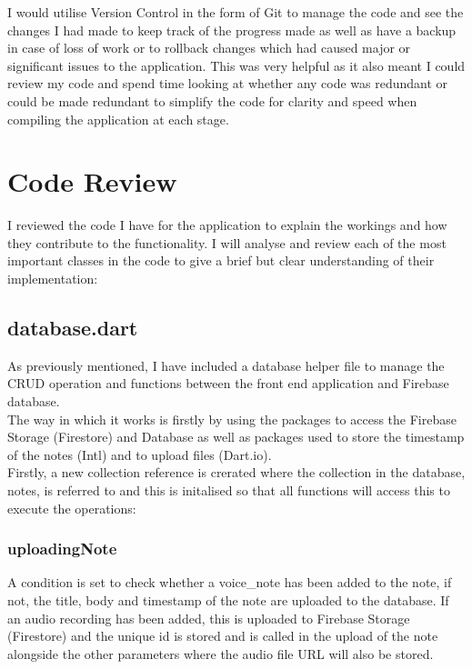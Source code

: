 \documentclass{report}
\begin{document}
I would utilise Version Control in the form of Git to manage the code and see the changes I had made to keep track of the progress made as well as have a backup in case of loss of work or to rollback changes which had caused major or significant issues to the application. This was very helpful as it  also meant I could review my code and spend time looking at whether any code was redundant or could be made redundant to simplify the code for clarity and speed when compiling the application at each stage.

	\section{Code Review}
	I reviewed the code I have for the application to explain the workings and how they contribute to the functionality. I will analyse and review each of the most important classes in the code to give a brief but clear understanding of their implementation:

		\subsection{database.dart}
		As previously mentioned, I have included a database helper file to manage the CRUD operation and functions between the front end application and Firebase database.\\

The way in which it works is firstly by using the packages to access the Firebase Storage (Firestore) and Database as well as packages used to store the timestamp of the notes (Intl) and to upload files (Dart.io).\\

Firstly, a new collection reference is crerated where the collection in the database, notes, is referred to and this is initalised so that all functions will access this to execute the operations:

			\subsubsection{uploadingNote}
			A condition is set to check whether a voice\_note has been added to the note, if not, the title, body and timestamp of the note are uploaded to the database. If an audio recording has been added, this is uploaded to Firebase Storage (Firestore) and the unique id is stored and is called in the upload of the note alongside the other parameters where the audio file URL will also be stored. 
\end{document}

